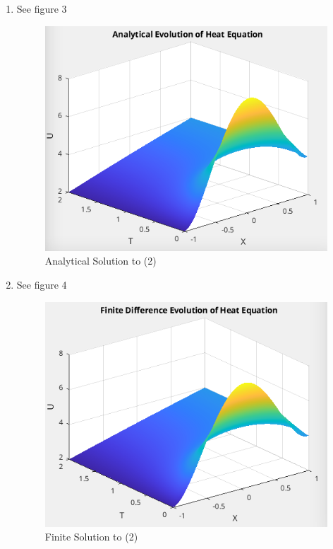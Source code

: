 \documentclass{article}
\begin{document}
\begin{enumerate}[label=\alph*)]
\begin{proof}
\begin{align*}
        \end{align*}
        Obviously, terms attached to $\sin(\theta)$ will evaluate to zero, and
        terms with $\cos(\theta)$ which are multiplied by $x^k$ will be
        proportional to $\left((-1)^n -1\right)$. We have then,
        \begin{align*}
            c_n &= 5\int_{-1}^1 (1 - 2x^2 + x^4)
            \sin\left(\frac{n\pi}{2}(x+1)\right)dx \\
                &= 5\left((-1)^n -1\right)\left(-\frac{2}{n\pi} -
                2\left(-\frac{2}{n\pi} + \frac{16}{n^3\pi^3}\right)
                -\frac{2}{n\pi} +\frac{96}{n^3\pi^3}
                -\frac{768}{n^5\pi^5}\right)\\
                &= 5\left((-1)^n -1\right)\left(\frac{64}{n^3\pi^3}
                -\frac{768}{n^5\pi^5}\right)
        \end{align*}
        Thus we have found the solution to our PDE. 
        \begin{align*}
            U(x,t) = 3 + x + \sum_n 5\left((-1)^n -1\right)\left(\frac{64}{n^3\pi^3}
                -\frac{768}{n^5\pi^5}\right)\sin\left(\frac{n\pi}{2}(x+1)\right)
                e^{-\frac{n^2\pi^2}{4}t}
        \end{align*}

    \end{proof}
    \item See figure 3
    \begin{figure}[ht]
        \centering
        \includegraphics[width=.5\textwidth]{q2_anal_sol.png}
        \caption{Analytical Solution to (2)}
    \end{figure}

    \item See figure 4
    \begin{figure}[ht]
        \centering
        \includegraphics[width=.5\textwidth]{q2_fd_sol.png}
        \caption{Finite Solution to (2)}
    \end{figure}


\end{enumerate}
\end{document}
